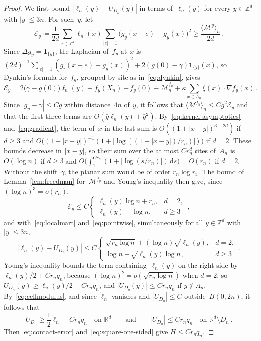 \documentclass[11pt]{amsart}
\theoremstyle{plain}
\theoremstyle{definition}
\newcommand{\Z}{\mathbb Z}
\newcommand{\R}{\mathbb R}
\newcommand{\drift}{\kappa}
\newcommand{\ind}{\mathbf 1}
\newcommand{\dd}{\,\mathrm d}
\numberwithin{equation}{section}
\begin{document}
\begin{proof}
We first bound $|\ell_n(y)-U_{D_n}(y)|$ in terms of~$\ell_n(y)$ for every $y\in\Z^d$ with $|y|\leq3n$. For such~$y$, let
\begin{equation*}
\mathcal E_y\coloneqq\frac1{2d}\sum_{x\in\Z^d}\ell_n(x)\sum_{|e|=1}\bigl(g_y(x+e)-g_y(x)\bigr)^2\geq\frac{\langle\mathcal M^y\rangle_n}{2d}\, .
\end{equation*}
Since $\Delta g_y=\ind_{\{y\}}$, the Laplacian of~$f_y$ at~$x$ is $(2d)^{-1}\sum_{|e|=1}(g_y(x+e)-g_y(x))^2+2(g(0)-\gamma)\ind_{\{y\}}(x)$, so Dynkin's formula for~$f_y$, grouped by site as in~\eqref{eq:dynkin}, gives
\begin{equation*}
\mathcal E_y=2\bigl(\gamma-g(0)\bigr)\ell_n(y)+f_y(X_n)-f_y(0)-\mathcal M^{f_y}_n+\drift\sum_{x\in A_n}\xi(x)\cdot\bar\nabla f_y(x)\, .
\end{equation*}
Since $|g_y-\gamma|\leq C\bar g$ within distance~$4n$ of~$y$, it follows that $\langle\mathcal M^{f_y}\rangle_n\leq C\bar g^2\mathcal E_y$ and that the first three terms are $O(\bar g\ell_n(y)+\bar g^2)$. By~\eqref{eq:kernel-asymptotics} and~\eqref{eq:gradient}, the term of~$x$ in the last sum is $O((1+|x-y|)^{3-2d})$ if $d\geq3$ and $O\bigl((1+|x-y|)^{-1}(1+|\log((1+|x-y|)/r_n)|)\bigr)$ if $d=2$. These bounds decrease in~$|x-y|$, so their sum over the at most $Cr_n^d$ sites of~$A_n$ is $O(\log n)$ if $d\geq3$ and $O\bigl(\int_1^{Cr_n}(1+|\log(s/r_n)|)\dd s\bigr)=O(r_n)$ if $d=2$. Without the shift~$\gamma$, the planar sum would be of order $r_n\log r_n$. The bound of Lemma~\ref{lem:freedman} for~$\mathcal M^{f_y}$ and Young's inequality then give, since $(\log n)^3=o(r_n)$,
\begin{equation*}
\mathcal E_y\leq C\begin{cases}\ell_n(y)\log n+r_n,&d=2,\\\ell_n(y)+\log n,&d\geq3\end{cases}\, ,
\end{equation*}
and with~\eqref{eq:localmart} and~\eqref{eq:pointwise}, simultaneously for all $y\in\Z^d$ with $|y|\leq3n$,
\begin{equation*}
|\ell_n(y)-U_{D_n}(y)|\leq C\begin{cases}\sqrt{r_n\log n}+(\log n)\sqrt{\ell_n(y)},&d=2,\\\log n+\sqrt{\ell_n(y)\log n},&d\geq3\end{cases}\, .
\end{equation*}
Young's inequality bounds the term containing~$\ell_n(y)$ on the right side by $\ell_n(y)/2+Cr_nq_n$, because $(\log n)^2=o(\sqrt{r_n\log n})$ when $d=2$; so $U_{D_n}(y)\geq\ell_n(y)/2-Cr_nq_n$, and $|U_{D_n}(y)|\leq Cr_nq_n$ if $y\notin A_n$. By~\eqref{eq:cellmodulus}, and since $\widetilde\ell_n$ vanishes and $|U_{D_n}|\leq C$ outside~$B(0,2n)$, it follows that
\begin{equation}\label{eq:square-one-sided}
U_{D_n}\geq\frac12\widetilde\ell_n-Cr_nq_n\quad\text{on }\R^d
\qquad\text{and}\qquad
|U_{D_n}|\leq Cr_nq_n\quad\text{on }\R^d\setminus D_n\, .
\end{equation}
Then \eqref{eq:contact-error} and~\eqref{eq:square-one-sided} give $H\leq Cr_nq_n$.
\end{proof}
\end{document}
